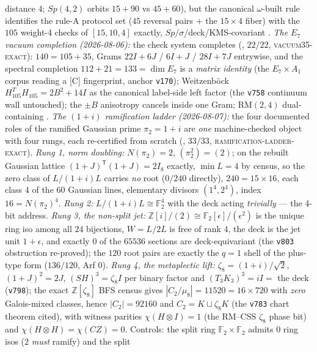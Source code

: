 \documentclass[11pt,a4paper]{article}
\newcommand{\Z}{\mathbb{Z}}
\theoremstyle{definition}
\begin{document}
\begin{keybox}
distance $4$; $Sp(4,2)$ orbits $15{+}90$ vs $45{+}60$), but the
canonical $\omega$-built rule identifies the rule-A protocol set
($45$ reversal pairs $+$ the $15\times4$ fiber) with the $105$
weight-4 checks of $[15,10,4]$ exactly,
$Sp/\sigma$/deck/KMS-covariant \mE.
\emph{The $E_7$ vacuum completion (2026-08-06):} the check system
completes
(, $22/22$,
\textsc{vacuum35-exact}): $140=105+35$, Grams $22I{+}6J$ /
$6I{+}J$ / $28I{+}7J$ entrywise, and the spectral completion
$112+21=133=\dim E_7$ is a \emph{matrix identity} (the
$E_7\times A_1$ corpus reading a [C] fingerprint, anchor
\texttt{v170}); Weitzenb\"ock $H_{105}^TH_{105}=2B^2+14I$ as the
canonical label-side left factor (the \texttt{v758} continuum
wall untouched); the $\pm B$ anisotropy cancels inside one Gram;
$\mathrm{RM}(2,4)$ dual-containing \mE.
\emph{The $(1{+}i)$ ramification ladder (2026-08-07):} the four
documented roles of the ramified Gaussian prime $\pi_2=1{+}i$ are
\emph{one} machine-checked object with four rungs, each
re-certified from scratch
(, $33/33$,
\textsc{ramification-ladder-exact}).  \emph{Rung 1, norm
doubling:} $N(\pi_2)=2$, $(\pi_2^2)=(2)$; on the rebuilt Gaussian
lattice $(1{+}J)^{\mathsf T}(1{+}J)=2I_8$ exactly, $\min L=4$ by
census, so the zero class of $L/(1{+}i)L$ carries \emph{no} root
($0/240$ directly), $240=15\times16$, each class $4$ of the $60$
Gaussian lines, elementary divisors $(1^4,2^4)$, index
$16=N(\pi_2)^4$.  \emph{Rung 2:} $L/(1{+}i)L\cong\mathbb F_2^4$
with the deck acting \emph{trivially} --- the 4-bit address.
\emph{Rung 3, the non-split jet:}
$\Z[i]/(2)\cong\mathbb F_2[\epsilon]/(\epsilon^2)$ is the unique
ring iso among all $24$ bijections, $W=L/2L$ is free of rank $4$,
the deck is the jet unit $1{+}\epsilon$, and exactly $0$ of the
$65536$ sections are deck-equivariant (the \texttt{v803}
obstruction re-proved); the $120$ root pairs are exactly the
$q=1$ shell of the plus-type form ($136/120$, Arf $0$).
\emph{Rung 4, the metaplectic lift:} $\zeta_8=(1{+}i)/\sqrt2$,
$(1{+}J)^2=2J$, $(SH)^3=\zeta_8I$ per binary factor and
$(T_3K_3)^3=iI=$ the deck (\texttt{v798}); the exact
$\Z[\zeta_8]$ BFS census gives $|C_2/\mu_8|=11520=16\times720$
with \emph{zero} Galois-mixed classes, hence $|C_2|=92160$ and
$C_2=K\sqcup\zeta_8K$ (the \texttt{v783} chart theorem cited),
with witness parities $\chi(H{\otimes}I)=1$ (the RM--CSS
$\zeta_8$ phase bit) and $\chi(H{\otimes}H)=\chi(CZ)=0$.
Controls: the split ring $\mathbb F_2\times\mathbb F_2$ admits
$0$ ring isos ($2$ \emph{must} ramify) and the split

\end{keybox}
\end{document}
